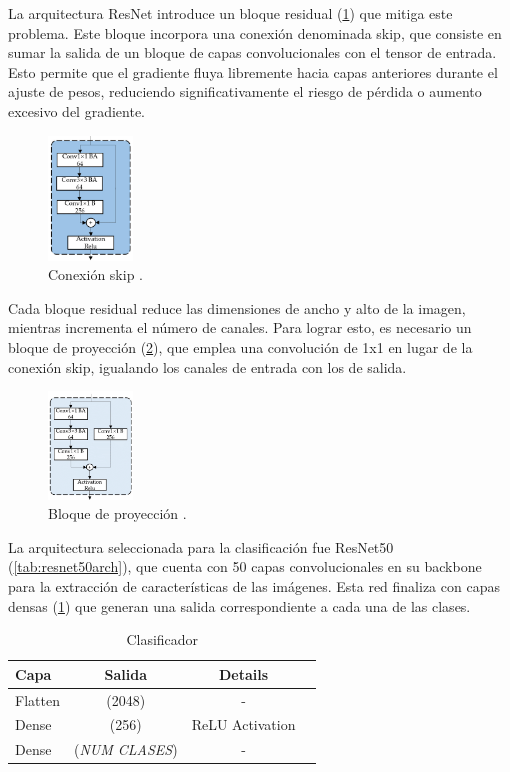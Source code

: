 \documentclass[twocolumn]{article}
\begin{document}
La arquitectura ResNet introduce un bloque residual (\ref{fig:skip}) que mitiga este problema. Este bloque incorpora una conexión denominada skip, que consiste en sumar la salida de un bloque de capas convolucionales con el tensor de entrada. Esto permite que el gradiente fluya libremente hacia capas anteriores durante el ajuste de pesos, reduciendo significativamente el riesgo de pérdida o aumento excesivo del gradiente.

\begin{figure}[!ht]
\centering
\includegraphics[width=0.2\textwidth]{assets/ResNet50Skip.png}
\caption{Conexión skip \cite{resnet50research}.}
\label{fig:skip}
\end{figure}

Cada bloque residual reduce las dimensiones de ancho y alto de la imagen, mientras incrementa el número de canales. Para lograr esto, es necesario un bloque de proyección (\ref{fig:projblock}), que emplea una convolución de 1x1 en lugar de la conexión skip, igualando los canales de entrada con los de salida.

\begin{figure}[!ht]
\centering
\includegraphics[width=0.2\textwidth]{assets/ResNet50Proj.png}
\caption{Bloque de proyección \cite{resnet50research}.}
\label{fig:projblock}
\end{figure}

La arquitectura seleccionada para la clasificación fue ResNet50 (\ref{tab:resnet50arch}), que cuenta con 50 capas convolucionales en su backbone para la extracción de características de las imágenes. Esta red finaliza con capas densas (\ref{tab:classifier}) que generan una salida correspondiente a cada una de las clases.

\begin{table}[h!]
\centering
\label{tab:classifier}
\begin{tabular}{|l|c|c|c|}
\hline
    \textbf{Capa} & \textbf{Salida}  & \textbf{Details} \\ \hline
    Flatten               & (2048)               & - \\ \hline
    Dense                 & (256)                & ReLU Activation \\ \hline
    Dense                 & (\textit{NUM CLASES})  & - \\ \hline
\end{tabular}
\caption{Clasificador}
\end{table}
\end{document}
